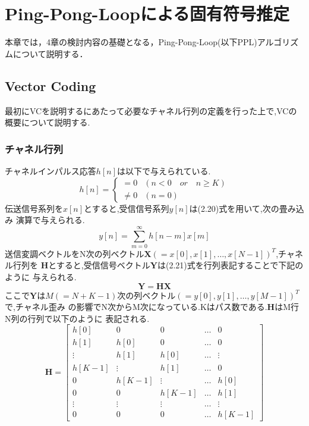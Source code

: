 \chapter{Ping-Pong-Loopによる固有符号推定}
本章では，4章の検討内容の基礎となる，Ping-Pong-Loop(以下PPL)アルゴリズムについて説明する．

\section{Vector Coding}
最初にVCを説明するにあたって必要なチャネル行列の定義を行った上で,VCの概要について説明する.

\subsection{チャネル行列}
チャネルインパルス応答$h[n]$は以下で与えられている.
\begin{equation}
    h[n] = \left\{
        \begin{array}{ll}
            = 0 & (n<0 \quad or \quad n \geq K) \\
            \neq 0 & (n=0)
        \end{array}
    \right.
\end{equation}
伝送信号系列を$x[n]$とすると,受信信号系列$y[n]$は(2.20)式を用いて,次の畳み込み
演算で与えられる.
\begin{equation}
    y[n] = \sum_{m=0}^\infty h[n-m]x[m]
\end{equation}
送信変調ベクトルをN次の列ベクトル$\bm{X}(=x[0],x[1],\ldots,x[N-1])^T$,チャネル行列を
$\bm{H}$とすると,受信信号ベクトル$\bm{Y}$は(2.21)式を行列表記することで下記のように
与えられる.
\begin{equation}
    \bm{Y} = \bm{HX}
\end{equation}
ここで$\bm{Y}$は$M(=N+K-1)$次の列ベクトル$(=y[0],y[1],\ldots,y[M-1])^T$で,チャネル歪み
の影響でN次からM次になっている.Kはパス数である.$\bm{H}$はM行N列の行列で以下のように
表記される.
\begin{equation}
    \bm{H} = \left[
        \begin{array}{ccccc}
            h[0] & 0 & 0 & \ldots & 0 \\
            h[1] & h[0] & 0 & \ldots & 0 \\
            \vdots & h[1] & h[0] & \ldots & \vdots \\
            h[K-1] & \vdots & h[1] & \ldots & 0 \\
            0 & h[K-1] & \vdots & \ldots & h[0] \\
            0 & 0 & h[K-1] & \ldots & h[1] \\
            \vdots & \vdots & \vdots & \ldots & \vdots \\
            0 & 0 & 0 & \ldots & h[K-1]
        \end{array}
    \right]
\end{equation}

